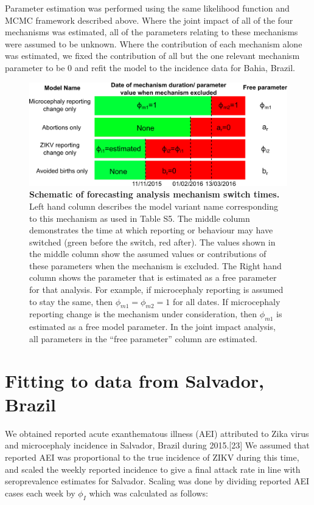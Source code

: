 \documentclass[10pt,letterpaper]{article}
\begin{document}
Parameter estimation was performed using the same likelihood function
and MCMC framework described above. Where the joint impact of all of the
four mechanisms was estimated, all of the parameters relating to these
mechanisms were assumed to be unknown. Where the contribution of each
mechanism alone was estimated, we fixed the contribution of all but the
one relevant mechanism parameter to be 0 and refit the model to the
incidence data for Bahia, Brazil.

\begin{figure}[htbp]
\centering
\includegraphics[width=5.20833in]{figures/Fig2.png}
\caption{\textbf{Schematic of forecasting analysis mechanism switch
times.} Left hand column describes the model variant name corresponding
to this mechanism as used in Table S5. The middle column demonstrates
the time at which reporting or behaviour may have switched (green before
the switch, red after). The values shown in the middle column show the
assumed values or contributions of these parameters when the mechanism
is excluded. The Right hand column shows the parameter that is estimated
as a free parameter for that analysis. For example, if microcephaly
reporting is assumed to stay the same, then \(\phi_{m1}=\phi_{m2}=1\)
for all dates. If microcephaly reporting change is the mechanism under
consideration, then \(\phi_{m1}\) is estimated as a free model
parameter. In the joint impact analysis, all parameters in the ``free
parameter'' column are estimated.}
\end{figure}

\section{Fitting to data from Salvador,
Brazil}\label{fitting-to-data-from-salvador-brazil}

We obtained reported acute exanthematous illness (AEI) attributed to
Zika virus and microcephaly incidence in Salvador, Brazil during
2015.{[}23{]} We assumed that reported AEI was proportional to the true
incidence of ZIKV during this time, and scaled the weekly reported
incidence to give a final attack rate in line with seroprevalence
estimates for Salvador. Scaling was done by dividing reported AEI cases
each week by \(\phi_I\) which was calculated as follows:
\end{document}
